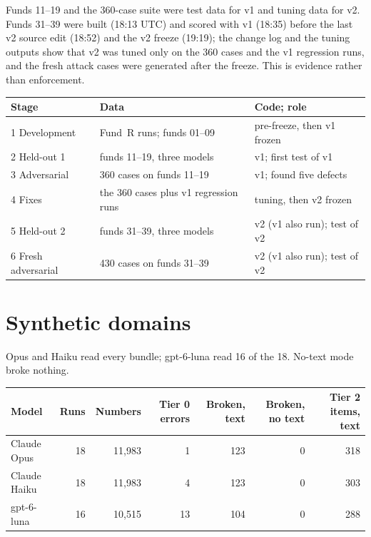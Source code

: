 \label{tab:stages}
Funds 11--19 and the 360-case suite were test data for v1 and tuning data for v2. Funds 31--39 were built (18:13 UTC) and scored with v1 (18:35) before the last v2 source edit (18:52) and the v2 freeze (19:19); the change log and the tuning outputs show that v2 was tuned only on the 360 cases and the v1 regression runs, and the fresh attack cases were generated after the freeze. This is evidence rather than enforcement.
\begin{center}
\begin{tabular}{lll}
\toprule
Stage & Data & Code; role \\
\midrule
1 Development & Fund~R runs; funds 01--09 & pre-freeze, then v1 frozen \\
2 Held-out 1 & funds 11--19, three models & v1; first test of v1 \\
3 Adversarial & 360 cases on funds 11--19 & v1; found five defects \\
4 Fixes & the 360 cases plus v1 regression runs & tuning, then v2 frozen \\
5 Held-out 2 & funds 31--39, three models & v2 (v1 also run); test of v2 \\
6 Fresh adversarial & 430 cases on funds 31--39 & v2 (v1 also run); test of v2 \\
\bottomrule
\end{tabular}
\end{center}

\section{Synthetic domains}\label{app:domains}
Opus and Haiku read every bundle; gpt-6-luna read 16 of the 18. No-text mode broke nothing.
\begin{center}
\begin{tabular}{lrrrrrr}
\toprule
Model & Runs & Numbers & Tier 0 errors & Broken, text & Broken, no text & Tier 2 items, text \\
\midrule
Claude Opus & 18 & 11,983 & 1 & 123 & 0 & 318 \\
Claude Haiku & 18 & 11,983 & 4 & 123 & 0 & 303 \\
gpt-6-luna & 16 & 10,515 & 13 & 104 & 0 & 288 \\
\bottomrule
\end{tabular}
\end{center}

